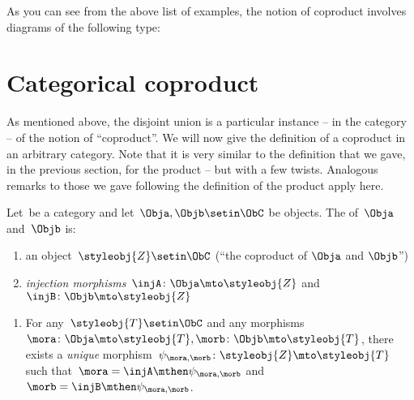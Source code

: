 
As you can see from the above list of examples, the notion of coproduct involves diagrams of the following type:
%

\section{Categorical coproduct}

As mentioned above, the disjoint union is a particular instance -- in the category \Set  -- of the notion of ``coproduct''.
We will now give the definition of a coproduct in an arbitrary category.
Note that it is very similar to the definition that we gave, in the previous section, for the product -- but with a few twists.
Analogous remarks to those we gave following the definition of the product apply here.

\begin{ctdefinition}
    \label{def:catcoproduct}
    Let~\CatC be a category and let~$\Obja, \Objb \setin \ObC$ be objects.
    The \emph{} of~$\Obja$ and~$\Objb$ is: \\
    \constit
    \begin{enumerate}
        \item an object~$\styleobj{Z} \setin \ObC$ (``the coproduct of $\Obja$ and $\Objb$'')
        \item \emph{injection morphisms}~$\injA \colon \Obja \mto \styleobj{Z} $ and~$\injB \colon \Objb \mto \styleobj{Z} $
    \end{enumerate}
    \condit
    \begin{enumerate}
        \item For any~$\styleobj{T} \setin \ObC$ and any morphisms~$\mora \colon  \Obja \mto \styleobj{T}, \morb \colon \Objb \mto \styleobj{T}$, there exists a \emph{unique} morphism~$\psi_{\mora, \morb} \colon \styleobj{Z} \mto \styleobj{T}$ such that~$\mora = \injA\mthen \psi_{\mora, \morb}$ and~$\morb = \injB \mthen \psi_{\mora,\morb}$.
    \end{enumerate}
\end{ctdefinition}

